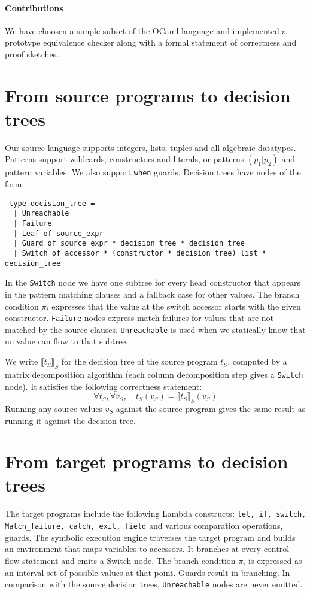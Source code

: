 \documentclass[12pt]{article}
\newcommand{\sem}[1]{{\llbracket{#1}\rrbracket}}
\begin{document}
\paragraph{Contributions} We have choosen a simple subset of the OCaml
language and implemented a prototype equivalence checker along with
a formal statement of correctness and proof sketches.

\section{From source programs to decision trees}
Our source language supports integers, lists, tuples and all algebraic
datatypes. Patterns support wildcards, constructors and literals, or
patterns $(p_1|p_2)$ and pattern variables.
We also support \texttt{when} guards.
Decision trees have nodes of the form:
\begin{lstlisting}
 type decision_tree =
  | Unreachable
  | Failure
  | Leaf of source_expr
  | Guard of source_expr * decision_tree * decision_tree
  | Switch of accessor * (constructor * decision_tree) list * decision_tree
\end{lstlisting}
In the \texttt{Switch} node we have one subtree for every head constructor
that appears in the pattern matching clauses and a fallback case for
other values. The branch condition $\pi_i$ expresses that the value at the
switch accessor starts with the given constructor.
\texttt{Failure} nodes express match failures for values that are not
matched by the source clauses.
\texttt{Unreachable} is used when we statically know that no value
can flow to that subtree.

We write $\sem{t_S}_S$ for the decision tree of the source program
$t_S$, computed by a matrix decomposition algorithm (each column
decomposition step gives a \texttt{Switch} node).
It satisfies the following correctness statement:
\[
\forall t_S, \forall v_S, \quad t_S(v_S) = \sem{t_S}_S(v_S)
\]
Running any source values $v_S$ against the source program gives the
same result as running it against the decision tree.

\section{From target programs to decision trees}
The target programs include the following Lambda constructs:
\texttt{let, if, switch, Match\_failure, catch, exit, field} and
various comparation operations, guards. The symbolic execution engine
traverses the target program and builds an environment that maps
variables to accessors. It branches at every control flow statement
and emits a Switch node. The branch condition $\pi_i$ is expressed as
an interval set of possible values at that point.
Guards result in branching. In comparison with the source decision
trees, \texttt{Unreachable} nodes are never emitted.
\end{document}
